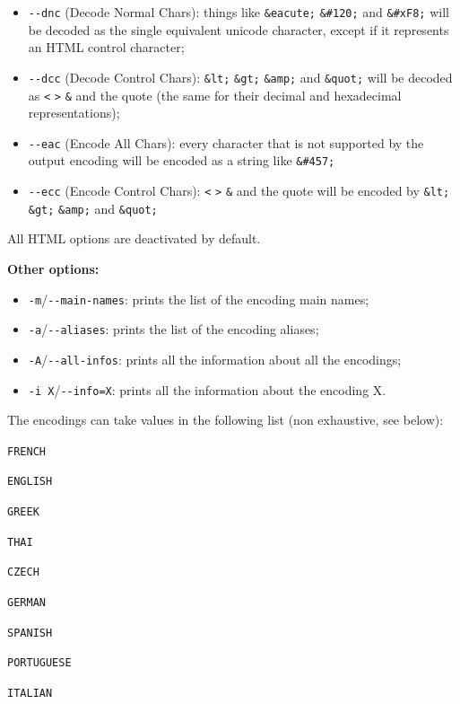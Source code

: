 \begin{itemize}
  \item \verb+--dnc+ (Decode Normal Chars): things like \verb+&eacute;+
  \verb+&#120;+ and \verb+&#xF8;+ will be decoded as the single equivalent 
  unicode character, except if it represents an HTML control character;
  
  \item \verb+--dcc+ (Decode Control Chars): \verb+&lt;+ \verb+&gt;+
  \verb+&amp;+ and \verb+&quot;+ will be decoded as \verb+<+ \verb+>+
  \verb+&+ and the quote (the same for their decimal and hexadecimal
  representations);
  
  \item \verb+--eac+ (Encode All Chars): every character that is not supported by
  the output encoding will be encoded as a string like \verb+&#457;+
  
  \item \verb+--ecc+ (Encode Control Chars): \verb+<+ \verb+>+
  \verb+&+ and the quote will be encoded by \verb+&lt;+ \verb+&gt;+
  \verb+&amp;+ and \verb+&quot;+
\end{itemize} 

\noindent All HTML options are deactivated by default.

\bigskip
\noindent \textbf{Other options:}
\begin{itemize}
  \item \verb+-m+/\verb+--main-names+: prints the list of the encoding main
  names;
  \item \verb+-a+/\verb+--aliases+: prints the list of the encoding aliases;
  \item \verb+-A+/\verb+--all-infos+: prints all the information about all the
  encodings;
  \item \verb+-i X+/\verb+--info=X+: prints all the information about the
  encoding X.
\end{itemize}

\bigskip
\noindent The encodings can take values in the following list (non exhaustive,
see below):

\bigskip
\verb$FRENCH$

\verb$ENGLISH$

\verb$GREEK$

\verb$THAI$

\verb$CZECH$

\verb$GERMAN$

\verb$SPANISH$

\verb$PORTUGUESE$

\verb$ITALIAN$

